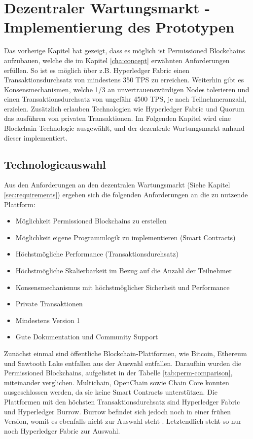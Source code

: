 \chapter{Dezentraler Wartungsmarkt - Implementierung des Prototypen}
\label{cha:wartungsmarkt-impl}

Das vorherige Kapitel hat gezeigt, dass es möglich ist Permissioned Blockchains aufzubauen, welche die im Kapitel \ref{cha:concept} erwähnten Anforderungen erfüllen. So ist es möglich über z.B. Hyperledger Fabric einen Transaktionsdurchsatz von mindestens 350 TPS zu erreichen. Weiterhin gibt es Konsensmechanismen, welche 1/3 an unvertrauenswürdigen Nodes tolerieren und einen Transaktionsdurchsatz von ungefähr 4500 TPS, je nach Teilnehmeranzahl, erzielen. Zusätzlich erlauben Technologien wie Hyperledger Fabric und Quorum das ausführen von privaten Transaktionen. Im Folgenden Kapitel wird eine Blockchain-Technologie ausgewählt, und der dezentrale Wartungsmarkt anhand dieser implementiert.  

\section{Technologieauswahl}
Aus den Anforderungen an den dezentralen Wartungsmarkt (Siehe Kapitel \ref{sec:requirements}) ergeben sich die folgenden Anforderungen an die zu nutzende Plattform: 

\begin{itemize}
    \item Möglichkeit Permissioned Blockchains zu erstellen
    \item Möglichkeit eigene Programmlogik zu implementieren (Smart Contracts)
    \item Höchstmögliche Performance (Transaktionsdurchsatz)
    \item Höchstmögliche Skalierbarkeit im Bezug auf die Anzahl der Teilnehmer
    \item Konsensmechanismus mit höchstmöglicher Sicherheit und Performance
    \item Private Transaktionen   
    \item Mindestens Version 1
    \item Gute Dokumentation und Community Support
\end{itemize}

Zunächst einmal sind öffentliche Blockchain-Plattformen, wie Bitcoin, Ethereum und Sawtooth Lake entfallen aus der Auswahl entfallen. Daraufhin wurden die Permissioned Blockchains, aufgelistet in der Tabelle \ref{tab:perm-comparison}, miteinander verglichen. Multichain, OpenChain sowie Chain Core konnten ausgeschlossen werden, da sie keine Smart Contracts unterstützen. Die Plattformen mit den höchsten Transaktionsdurchsatz sind Hyperledger Fabric und Hyperledger Burrow. Burrow befindet sich jedoch noch in einer frühen Version, womit es ebenfalls nicht zur Auswahl steht \cite{GitHubReleasesHyperledger2018}. Letztendlich steht so nur noch Hyperledger Fabric zur Auswahl. 

